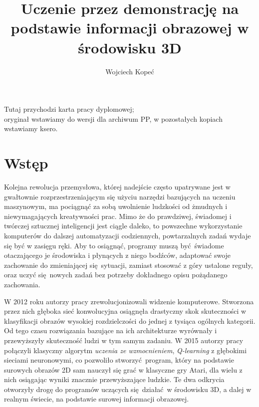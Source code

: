 \documentclass[polish,master,a4paper,oneside]{ppfcmthesis}
\author{
   Wojciech Kopeć \album{101675}
}
\title{Uczenie przez demonstrację na podstawie informacji obrazowej w środowisku 3D
}
\begin{document}
\frontmatter\pagestyle{empty}
\maketitle\cleardoublepage

\thispagestyle{empty}\vspace*{\fill}
\begin{center}Tutaj przychodzi karta pracy dyplomowej;\\oryginał wstawiamy do wersji dla archiwum PP, w pozostałych kopiach wstawiamy ksero.\end{center}
\vfill\cleardoublepage

\pagestyle{ppfcmthesis}
\tableofcontents* \cleardoublepage

\mainmatter
\chapter{Wstęp}

Kolejna rewolucja przemysłowa, której nadejście często upatrywane jest w gwałtownie rozprzestrzeniającym się użyciu narzędzi bazujących na uczeniu maszynowym, ma pociągnąć za sobą uwolnienie ludzkości od żmudnych i niewymagających kreatywności prac. Mimo że do prawdziwej, świadomej i twórczej sztucznej inteligencji jest ciągle daleko, to powszechne wykorzystanie komputerów do dalszej automatyzacji codziennych, powtarzalnych zadań wydaje się być w zasięgu ręki. Aby to osiągnąć, programy muszą być świadome otaczającego je środowiska i płynących z niego bodźców, adaptować swoje zachowanie do zmieniającej się sytuacji, zamiast stosować z góry ustalone reguły, oraz uczyć się nowych zadań bez potrzeby dokładnego opisu pożądanego zachowania. 

W 2012 roku autorzy pracy \cite{NIPS2012_4824} zrewolucjonizowali widzenie komputerowe. Stworzona przez nich głęboka sieć konwolucyjna osiągnęła drastyczny skok skuteczności w klasyfikacji obrazów wysokiej rozdzielczości do jednej z tysiąca ogólnych kategorii. Od tego czasu rozwiązania bazujące na ich architekturze wyrównały i przewyższyły skuteczność ludzi w tym samym zadaniu. W 2015 autorzy pracy \cite{mnih2015human} połączyli klasyczny algorytm \textit{uczenia ze wzmocnieniem}, \textit{Q-learning} z głębokimi sieciami neuronowymi, co pozwoliło stworzyć program, który na podstawie surowych obrazów 2D sam nauczył się grać w klasyczne gry Atari, dla wielu z nich osiągając wyniki znacznie przewyższające ludzkie. Te dwa odkrycia otworzyły drogę do programów uczących się działać w środowisku 3D, a dalej w realnym świecie, na podstawie surowej informacji obrazowej.
\end{document}
